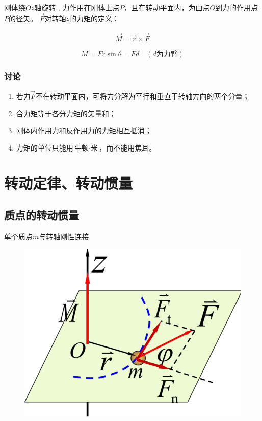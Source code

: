 \documentclass[12pt, a4paper]{article}
\numberwithin{equation}{section}
\begin{document}
    刚体绕\(Oz\)轴旋转 , 力作用在刚体上点\(P\)，且在转动平面内，为由点\(O\)到力的作用点\(P\)的径矢。
    \(\overrightarrow{F}\)对转轴\(z\)的力矩的定义：

    \begin{align}
        \overrightarrow{M} = \overrightarrow{r} \times \overrightarrow{F}
    \end{align}

    $$
        M = Fr\sin\theta = Fd \quad (d\text{为力臂})
    $$

\subsubsection{讨论}

    \begin{enumerate}
        \item 若力\(\overrightarrow{F}\)不在转动平面内，可将力分解为平行和垂直于转轴方向的两个分量；
        \item 合力矩等于各分力矩的矢量和；
        \item 刚体内作用力和反作用力的力矩相互抵消；
        \item 力矩的单位只能用\(\text{牛顿} \cdot \text{米}\)，而不能用焦耳。
    \end{enumerate}

\section{转动定律、转动惯量}

\subsection{质点的转动惯量}

    单个质点\(m\)与转轴刚性连接

    \begin{figure}
        \centering
        \includegraphics[scale=0.2]{"Chapter 04 images/pic4.png"}
        \label{pic4-4}
    \end{figure}
\end{document}
